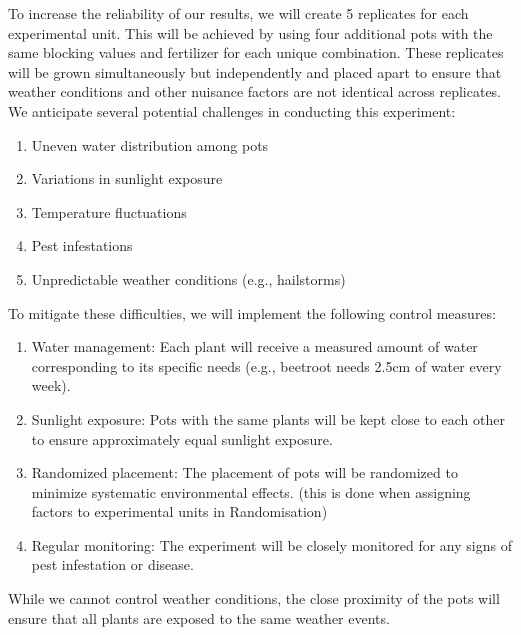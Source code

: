 \documentclass{article}
\begin{document}

To increase the reliability of our results, we will create 5 replicates for each experimental unit. This will be achieved by using four additional pots with the same blocking values and fertilizer for each unique combination. These replicates will be grown simultaneously but independently and placed apart to ensure that weather conditions and other nuisance factors are not identical across replicates. \\ 

We anticipate several potential challenges in conducting this experiment:
\begin{enumerate}
    \item Uneven water distribution among pots
    \item Variations in sunlight exposure
    \item Temperature fluctuations
    \item Pest infestations
    \item Unpredictable weather conditions (e.g., hailstorms)
\end{enumerate}
To mitigate these difficulties, we will implement the following control measures:
\begin{enumerate}
    \item Water management: Each plant will receive a measured amount of water corresponding to its specific needs (e.g., beetroot needs 2.5cm of water every week).
    \item Sunlight exposure: Pots with the same plants will be kept close to each other to ensure approximately equal sunlight exposure.
    \item Randomized placement: The placement of pots will be randomized to minimize systematic environmental effects. (this is done when assigning factors to experimental units in Randomisation)
    \item Regular monitoring: The experiment will be closely monitored for any signs of pest infestation or disease.    
\end{enumerate}
While we cannot control weather conditions, the close proximity of the pots will ensure that all plants are exposed to the same weather events.
\end{document}
